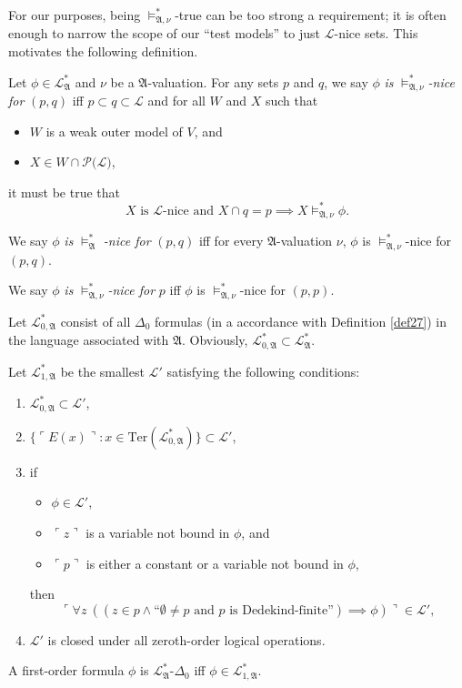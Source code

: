 \documentclass[12pt]{article}
\numberwithin{equation}{section}
\begin{document}
For our purposes, being $\models^*_{\mathfrak{A}, \nu}$-true can be too strong a requirement; it is often enough to narrow the scope of our ``test models'' to just $\mathcal{L}$-nice sets. This motivates the following definition.

\begin{defi}
Let $\phi \in \mathcal{L}^{*}_{\mathfrak{A}}$ and $\nu$ be a $\mathfrak{A}$-valuation. For any sets $p$ and $q$, we say $\phi$ \emph{is} $\models^*_{\mathfrak{A}, \nu}$\emph{-nice for} $(p, q)$ iff  $p \subset q \subset \mathcal{L}$ and for all $W$ and $X$ such that
\begin{itemize}
    \item $W$ is a weak outer model of $V$, and
    \item $X \in W \cap \mathcal{P}(\mathcal{L)}$, 
\end{itemize}
it must be true that $$X \text{ is } \mathcal{L} \text{-nice and } X \cap q = p \implies X \models^*_{\mathfrak{A}, \nu} \phi.$$


We say $\phi$ \emph{is} $\models^*_{\mathfrak{A}}$ \emph{-nice for} $(p, q)$ iff for every $\mathfrak{A}$-valuation $\nu$, $\phi$ is $\models^*_{\mathfrak{A}, \nu}$-nice for $(p, q)$.

We say $\phi$ \emph{is} $\models^*_{\mathfrak{A}, \nu}$\emph{-nice for} $p$ iff $\phi$ is $\models^*_{\mathfrak{A}, \nu}$-nice for $(p, p)$.
\end{defi}

\begin{defi}\label{lsub}
Let $\mathcal{L}^{*}_{0, \mathfrak{A}}$ consist of all $\Delta_0$ formulas (in a accordance with Definition \ref{def27}) in the language associated with $\mathfrak{A}$. Obviously, $\mathcal{L}^{*}_{0, \mathfrak{A}} \subset \mathcal{L}^{*}_{\mathfrak{A}}$.

Let $\mathcal{L}^{*}_{1, \mathfrak{A}}$ be the smallest $\mathcal{L}'$ satisfying the following conditions:
\begin{enumerate}[label=(\alph*)]
    \item $\mathcal{L}^{*}_{0, \mathfrak{A}} \subset \mathcal{L}'$,
    \item $\{\ulcorner E(x) \urcorner : x \in \mathrm{Ter}(\mathcal{L}^{*}_{0, \mathfrak{A}})\} \subset \mathcal{L}'$,
    \item if 
    \begin{itemize}[label=$\circ$]
        \item $\phi \in \mathcal{L}'$,
        \item $\ulcorner z \urcorner$ is a variable not bound in $\phi$, and
        \item $\ulcorner p \urcorner$ is either a constant or a variable not bound in $\phi$,
    \end{itemize} 
    then $$\ulcorner \forall z \ ((z \in p \wedge \text{``}\emptyset \neq p \text{ and } p \text{ is Dedekind-finite''}) \implies \phi) \urcorner \in \mathcal{L}',$$
    \item $\mathcal{L}'$ is closed under all zeroth-order logical operations.
\end{enumerate}
A first-order formula $\phi$ is $\mathcal{L}^{*}_{\mathfrak{A}}$-$\Delta_0$ iff $\phi \in \mathcal{L}^{*}_{1, \mathfrak{A}}$. 
\end{defi}
\end{document}
